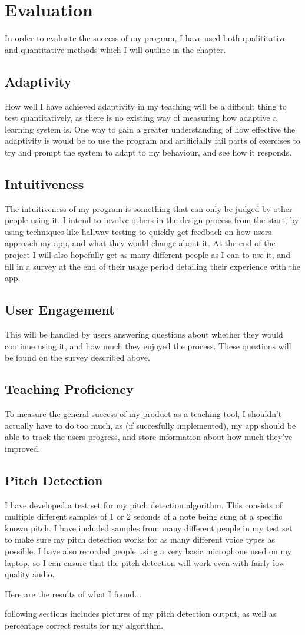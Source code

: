 \chapter{Evaluation}

In order to evaluate the success of my program, I have used both qualititative and quantitative methods which I will outline in the chapter.

\section{Adaptivity}
How well I have achieved adaptivity in my teaching will be a difficult thing to test quantitatively, as there is no existing way of measuring how adaptive a learning system is. One way to gain a greater understanding of how effective the adaptivity is would be to use the program and artificially fail parts of exercises to try and prompt the system to adapt to my behaviour, and see how it responds.

\section{Intuitiveness}
The intuitiveness of my program is something that can only be judged by other people using it. I intend to involve others in the design process from the start, by using techniques like hallway testing to quickly get feedback on how users approach my app, and what they would change about it. At the end of the project I will also hopefully get as many different people as I can to use it, and fill in a survey at the end of their usage period detailing their experience with the app.
\section{User Engagement}
This will be handled by users answering questions about whether they would continue using it, and how much they enjoyed the process. These questions will be found on the survey described above.

\section{Teaching Proficiency}
To measure the general success of my product as a teaching tool, I shouldn't actually have to do too much, as (if succesfully implemented), my app should be able to track the users progress, and store information about how much they've improved.

\section{Pitch Detection}
I have developed a test set for my pitch detection algorithm. This consists of multiple different samples of 1 or 2 seconds of a note being sung at a specific  known pitch. I have included samples from many different people in my test set to make sure my pitch detection works for as many different voice types as possible. I have also recorded people using a very basic microphone used on my laptop, so I can ensure that the pitch detection will work even with fairly low quality audio. 

Here are the results of what I found...

following sections includes pictures of my pitch detection output, as well as percentage correct results for my algorithm.